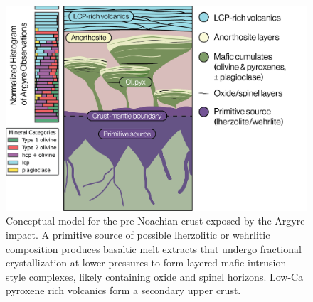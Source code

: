 \documentclass[11pt]{article}
\begin{document}
\begin{figure}
    \centering
    \includegraphics[width=\textwidth]
    {figures/04_crust_strat_sketch_v2.png}
    \caption{Conceptual model for the pre-Noachian crust exposed by the Argyre impact. A primitive source of possible lherzolitic or wehrlitic composition produces basaltic melt extracts that undergo fractional crystallization at lower pressures to form layered-mafic-intrusion style complexes, likely containing oxide and spinel horizons. Low-Ca pyroxene rich volcanics form a secondary upper crust.}
    \label{fig:concept_sketch}
\end{figure}
\end{document}
